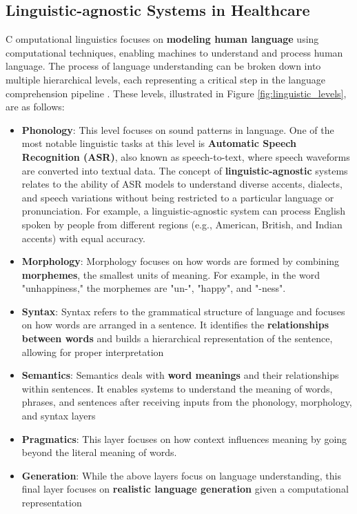 \subsection{Linguistic-agnostic Systems in Healthcare}
\label{sec:linguistic_agnostic}
\lettrine{C}{ }omputational linguistics focuses on \textcolor{TUMRed}{\textbf{modeling human language}} using computational techniques, enabling machines to understand and process human language. The process of language understanding can be broken down into multiple hierarchical levels, each representing a critical step in the language comprehension pipeline \cite{cohen2022intelligent}. These levels, illustrated in Figure \ref{fig:linguistic_levels}, are as follows:
\begin{itemize}
    \item \textcolor{TUMRed}{\textbf{Phonology}}: This level focuses on sound patterns in language. One of the most notable linguistic tasks at this level is \textcolor{TUMRed}{\textbf{Automatic Speech Recognition (ASR)}}, also known as speech-to-text, where speech waveforms are converted into textual data. The concept of \textcolor{TUMRed}{\textbf{linguistic-agnostic}} systems relates to the ability of ASR models to understand diverse accents, dialects, and speech variations without being restricted to a particular language or pronunciation. For example, a linguistic-agnostic system can process English spoken by people from different regions (e.g., American, British, and Indian accents) with equal accuracy.
    \item \textcolor{TUMRed}{\textbf{Morphology}}: Morphology focuses on how words are formed by combining \textcolor{TUMRed}{\textbf{morphemes}}, the smallest units of meaning. For example, in the word "unhappiness," the morphemes are "un-", "happy", and "-ness".
    \item \textcolor{TUMRed}{\textbf{Syntax}}: Syntax refers to the grammatical structure of language and focuses on how words are arranged in a sentence. It identifies the \textcolor{TUMRed}{\textbf{relationships between words}} and builds a hierarchical representation of the sentence, allowing for proper interpretation
    \item \textcolor{TUMRed}{\textbf{Semantics}}: Semantics deals with \textcolor{TUMRed}{\textbf{word meanings}} and their relationships within sentences. It enables systems to understand the meaning of words, phrases, and sentences after receiving inputs from the phonology, morphology, and syntax layers
    \item \textcolor{TUMRed}{\textbf{Pragmatics}}: This layer focuses on how context influences meaning by going beyond the literal meaning of words. 
    \item \textcolor{TUMRed}{\textbf{Generation}}: While the above layers focus on language understanding, this final layer focuses on \textcolor{TUMRed}{\textbf{realistic language generation}} given a computational representation 
\end{itemize}

